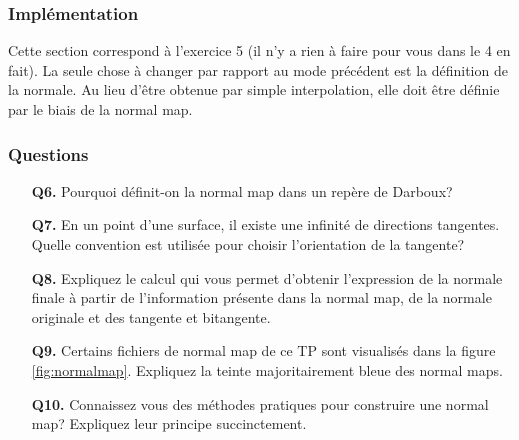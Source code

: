 \documentclass{article}
\begin{document}
\subsubsection{Implémentation}
Cette section correspond à l'exercice 5 (il n'y a rien à faire pour vous dans le 4 en fait).
La seule chose à changer par rapport au mode précédent est la définition de la normale. Au lieu d'être obtenue par simple interpolation, elle doit être définie par le biais de la normal map.

\subsubsection{Questions}
\begin{itemize}
\item[{\bf Q6.}] Pourquoi définit-on la normal map dans un repère de Darboux?
\item[{\bf Q7.}] En un point d'une surface, il existe une infinité de directions
  tangentes. Quelle convention est utilisée pour choisir l'orientation de la
  tangente? %

\item[{\bf Q8.}] Expliquez le calcul qui vous permet d'obtenir l'expression de la normale finale à partir de l'information présente dans la normal map, de la normale originale et des tangente et bitangente.

\item[{\bf Q9.}] Certains fichiers de normal map de ce TP sont visualisés dans la figure \ref{fig:normalmap}. Expliquez la teinte majoritairement bleue des normal maps.

\item[{\bf Q10.}] Connaissez vous des méthodes pratiques pour construire une normal map? Expliquez leur principe succinctement.
\end{itemize}
\end{document}
